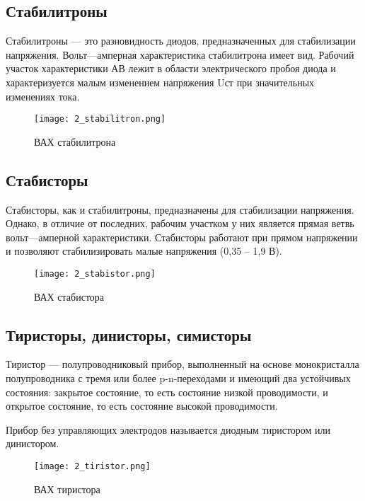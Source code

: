 \subsection*{Стабилитроны}

Стабилитроны --- это разновидность диодов, предназначенных для стабилизации напряжения. Вольт---амперная характеристика стабилитрона имеет вид. Рабочий участок характеристики АВ лежит в области электрического пробоя диода и характеризуется малым изменением напряжения Uст при значительных изменениях тока.

\begin{figure}[H]
\centering
\texttt{[image: 2\_stabilitron.png]}
\caption{ВАХ стабилитрона}
\label{fig:2_stabilitron}
\end{figure}

\subsection*{Стабисторы}

Стабисторы, как и стабилитроны, предназначены для стабилизации напряжения. Однако, в отличие от последних, рабочим участком у них является прямая ветвь вольт---амперной характеристики. Стабисторы работают при прямом напряжении и позволяют стабилизировать малые напряжения (0,35 -- 1,9 В).

\begin{figure}[H]
\centering
\texttt{[image: 2\_stabistor.png]}
\caption{ВАХ стабистора}
\label{fig:2_stabistor}
\end{figure}

\subsection*{Тиристоры, динисторы, симисторы}

Тиристор --- полупроводниковый прибор, выполненный на основе монокристалла полупроводника с тремя или более p-n-переходами и имеющий два устойчивых состояния: закрытое состояние, то есть состояние низкой проводимости, и открытое состояние, то есть состояние высокой проводимости.

Прибор без управляющих электродов называется диодным тиристором или динистором.

\begin{figure}[H]
\centering
\texttt{[image: 2\_tiristor.png]}
\caption{ВАХ тиристора}
\label{fig:2_tiristor}
\end{figure}


